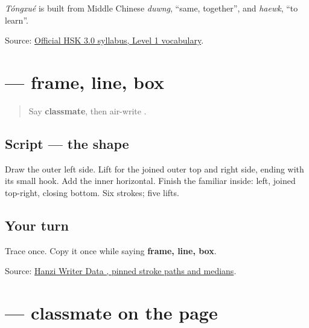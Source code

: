 \emph{Tóngxué} is built from Middle Chinese \emph{duwng}, \textquotedblleft{}same, together\textquotedblright{}, and \emph{haewk}, \textquotedblleft{}to learn\textquotedblright{}.

\begin{tcolorbox}[breakable,colback=teal!4,colframe=teal!35!black,title={Before you move on}]
Source: \href{https://hsk.cn-bj.ufileos.com/3.0/\%E6\%96\%B0\%E7\%89\%88HSK\%E8\%80\%83\%E8\%AF\%95\%E5\%A4\%A7\%E7\%BA\%B21219.pdf}{Official HSK 3.0 syllabus, Level 1 vocabulary}.
\end{tcolorbox}
\section[\texorpdfstring{\zh{同} (tóng)}{同 (tóng)}]{ — frame, line, box}

\label{lesson:ZH-W15-tong}



\begin{quote}
Say \textbf{classmate}, then air-write .
\end{quote}

\subsection*{Script — the shape}

Draw the outer left side. Lift for the joined outer top and right side, ending with its small hook. Add the inner horizontal. Finish the familiar  inside: left, joined top-right, closing bottom. Six strokes; five lifts.

\subsection*{Your turn}
Trace \textbf{} once. Copy it once while saying \textbf{frame, line, box}.

\begin{tcolorbox}[breakable,colback=teal!4,colframe=teal!35!black,title={Before you move on}]
Source: \href{https://raw.githubusercontent.com/chanind/hanzi-writer-data/68d10a4b21150cae5e1ebbd223eed289cf32d90c/data/\%E5\%90\%8C.json}{Hanzi Writer Data , pinned stroke paths and medians}.
\end{tcolorbox}
\section[\texorpdfstring{\zh{同学} (tóngxué)}{同学 (tóngxué)}]{ — classmate on the page}

